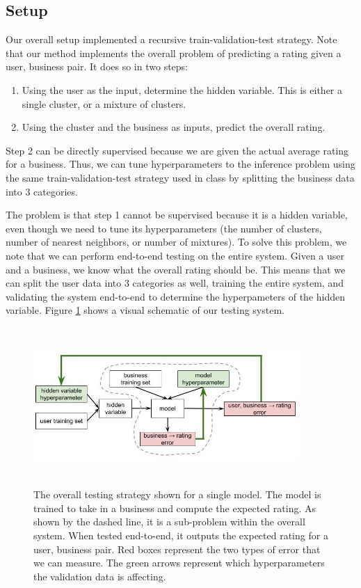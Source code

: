 \documentclass[11pt]{article}
\begin{document}
\subsection{Setup}
Our overall setup implemented a recursive train-validation-test strategy. Note that our method implements the overall problem of predicting a rating given a user, business pair. It does so in two steps:
\begin{enumerate}
\item Using the user as the input, determine the hidden variable. This is either a single cluster, or a mixture of clusters.
\item Using the cluster and the business as inputs, predict the overall rating.
\end{enumerate}

Step 2 can be directly supervised because we are given the actual average rating for a business. Thus, we can tune hyperparameters to the inference problem using the same train-validation-test strategy used in class by splitting the business data into 3 categories.

The problem is that step 1 cannot be supervised because it is a hidden variable, even though we need to tune its hyperparameters (the number of clusters, number of nearest neighbors, or number of mixtures). To solve this problem, we note that we can perform end-to-end testing on the entire system. Given a user and a business, we know what the overall rating should be. This means that we can split the user data into 3 categories as well, training the entire system, and validating the system end-to-end to determine the hyperpameters of the hidden variable. Figure \ref{fig:testing} shows a visual schematic of our testing system.

\begin{figure}[h!]
    \centering
    \includegraphics[width=0.9\textwidth, height=6cm]{testing_v2}
    \caption{The overall testing strategy shown for a single model. The model is trained to take in a business and compute the expected rating. As shown by the dashed line, it is a sub-problem within the overall system. When tested end-to-end, it outputs the expected rating for a user, business pair. Red boxes represent the two types of error that we can measure. The green arrows represent which hyperparameters the validation data is affecting.}
    \label{fig:testing}
\end{figure} 
\end{document}
